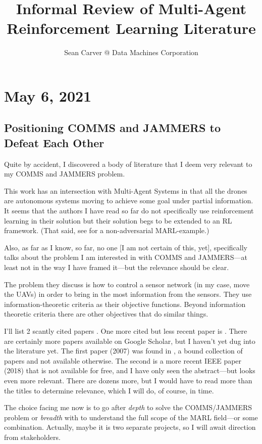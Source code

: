 \documentclass{article}
\title{Informal Review of Multi-Agent Reinforcement Learning Literature}
\author{Sean Carver @ Data Machines Corporation}
\begin{document}
\maketitle

\section{May 6, 2021}
\subsection{Positioning COMMS and JAMMERS to Defeat Each Other}
Quite by accident, I discovered a body of literature that I deem very
relevant to my COMMS and JAMMERS problem.

This work has an intersection with Multi-Agent Systems in that all the
drones are autonomous systems moving to achieve some goal under
partial information.  It seems that the authors I have read so far do
not specifically use reinforcement learning in their solution but
their solution begs to be extended to an RL framework.  (That said,
see \cite{testi2020reinforcement} for a non-adversarial MARL-example.)

Also, as far as I know, so far, no one [I am not certain of this,
yet], specifically talks about the problem I am interested in with
COMMS and JAMMERS---at least not in the way I have framed it---but the
relevance should be clear.

The problem they discuss is how to control a sensor network (in my
case, move the UAVs) in order to bring in the most information from
the sensors.  They use information-theoretic criteria as their
objective functions.  Beyond information theoretic criteria there are
other objectives that do similar things.

I'll list 2 scantly cited papers \cite{nicholson2007information,
  guerra2018collaborative}.  One more cited but less recent paper is
\cite{grocholsky2003scalable}.  There are certainly more papers
available on Google Scholar, but I haven't yet dug into the literature
yet.  The first paper (2007) was found in \cite{pechoucek2008defense},
a bound collection of papers and not available otherwise.  The second
is a more recent IEEE paper (2018) that is not available for free, and
I have only seen the abstract---but looks even more relevant.  There
are dozens more, but I would have to read more than the titles to
determine relevance, which I will do, of course, in time.

The choice facing me now is to go after \emph{depth} to solve the
COMMS/JAMMERS problem or \emph{breadth} with to understand the full
scope of the MARL field---or some combination.  Actually, maybe it is
two separate projects, so I will await direction from stakeholders.
\end{document}
